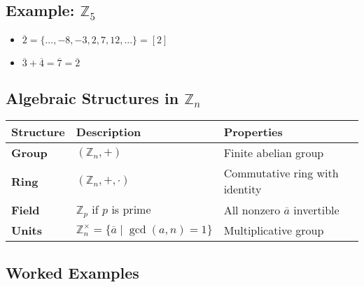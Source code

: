 \documentclass[
]{article}
\providecommand{\tightlist}{%
  \setlength{\itemsep}{0pt}\setlength{\parskip}{0pt}}
\begin{document}
\subsection{\texorpdfstring{Example:
\(\mathbb{Z}_5\)}{Example: \textbackslash mathbb\{Z\}\_5}}\label{example-mathbbz_5}

\begin{itemize}
\tightlist
\item
  \(\overline{2} = \{ ..., -8, -3, 2, 7, 12, ... \} = [2]\)
\item
  \(\overline{3} + \overline{4} = \overline{7} = \overline{2}\)
\end{itemize}

\subsection{\texorpdfstring{Algebraic Structures in
\(\mathbb{Z}_n\)}{Algebraic Structures in \textbackslash mathbb\{Z\}\_n}}\label{algebraic-structures-in-mathbbz_n}

\begin{longtable}[]{@{}
  >{\raggedright\arraybackslash}p{}
  >{\raggedright\arraybackslash}p{}
  >{\raggedright\arraybackslash}p{}@{}}
\toprule\noalign{}
\begin{minipage}[b]{\linewidth}\raggedright
Structure
\end{minipage} & \begin{minipage}[b]{\linewidth}\raggedright
Description
\end{minipage} & \begin{minipage}[b]{\linewidth}\raggedright
Properties
\end{minipage} \\
\midrule\noalign{}
\endhead
\bottomrule\noalign{}
\endlastfoot
\textbf{Group} & \((\mathbb{Z}_n, +)\) & Finite abelian group \\
\textbf{Ring} & \((\mathbb{Z}_n, +, \cdot)\) & Commutative ring with
identity \\
\textbf{Field} & \(\mathbb{Z}_p\) if \(p\) is prime & All nonzero
\(\overline{a}\) invertible \\
\textbf{Units} &
\(\mathbb{Z}_n^\times = \{ \overline{a} \mid \gcd(a,n)=1 \}\) &
Multiplicative group \\
\end{longtable}

\subsection{Worked Examples}\label{worked-examples}
\end{document}
